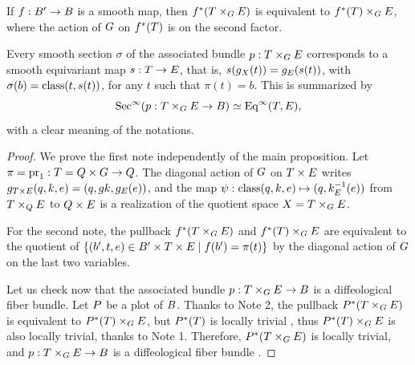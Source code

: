 \begin{article}
   If $f : \B' \to \B$ is a smooth map,
  then $f^*(\T \times_\G \E)$ is equivalent  to $f^*(\T) \times_\G \E$,
  where the action of $\G$ on $f^*(\T)$ is on the second factor.
  
   Every smooth section $\sigma$ of the associated bundle $p : \T \times_\G \E$ corresponds to a smooth equivariant map $s : \T \to \E$,
  that is,
  $s(g_\X(t)) = g_\E(s(t))$, with
  $\sigma(b) = \class(t, s(t))$,
  for any $t$ such that $\pi(t) = b$.
  This is summarized by
  $$%
  \Sec^\infty(p : \T \times_\G \E \to \B) \simeq \Eq^\infty(\T, \E),
  $$%
  with a clear meaning of the notations.
\end{article} %

\begin{proof}
  We prove the first note independently of the main proposition.
  Let $\pi = \pr_1 : \T = \Q \times \G \to \Q$.
  The diagonal action of $\G$ on $\T \times \E$ writes $g_{\T \times \E}(q,k,e) = (q,gk,g_\E(e))$,
  and the map $ \psi : \class(q,k,e) \mapsto (q,k_\E^{-1}(e))$ from $\T \times_\Q \E$ to $\Q \times \E$ is a realization of the quotient space $\X = \T \times_\G \E$.
  
  For the second note,
  the pullback $f^*(\T \times_\G \E)$ and $f^*(\T) \times_\G \E$ are equivalent to the quotient of $\{ (b', t, e)  \in \B' \times \T \times \E \mid f(b') = \pi(t) \}$ by the diagonal action of $\G$ on the last two variables.
  
  Let us check now that the associated bundle $p : \T \times_\G \E \to \B$ is a diffeological fiber bundle.
  Let $\P$ be a plot of $\B$.
  Thanks to Note 2,
  the pullback $\P^*(\T \times_\G \E)$ is equivalent to $\P^*(\T) \times_\G \E$,
  but $\P^*(\T)$ is locally trivial ,
  thus $\P^*(\T) \times_\G \E$ is also locally trivial,
  thanks to Note 1.
  Therefore,
  $\P^*(\T \times_\G \E)$ is locally trivial,
  and $p : \T \times_\G \E \to \B$ is a diffeological fiber bundle .
  

\end{proof}
